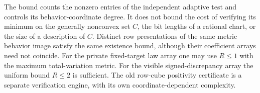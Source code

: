 \begin{remark}\label{rem:v17-size}
The bound counts the nonzero entries of the independent adaptive test
and controls its behavior-coordinate degree. It does not bound the
cost of verifying its minimum on the generally nonconvex set $C$,
the bit lengths of a rational chart, or the size of a description of
$C$. Distinct row presentations of the same metric behavior image
satisfy the same existence bound, although their coefficient arrays
need not coincide. For the private fixed-target law array one may use
$R\le1$ with the maximum total-variation metric. For the visible
signed-discrepancy array the uniform bound $R\le2$ is sufficient.
The old row-cube positivity certificate is a separate verification
engine, with its own coordinate-dependent complexity.
\end{remark}

